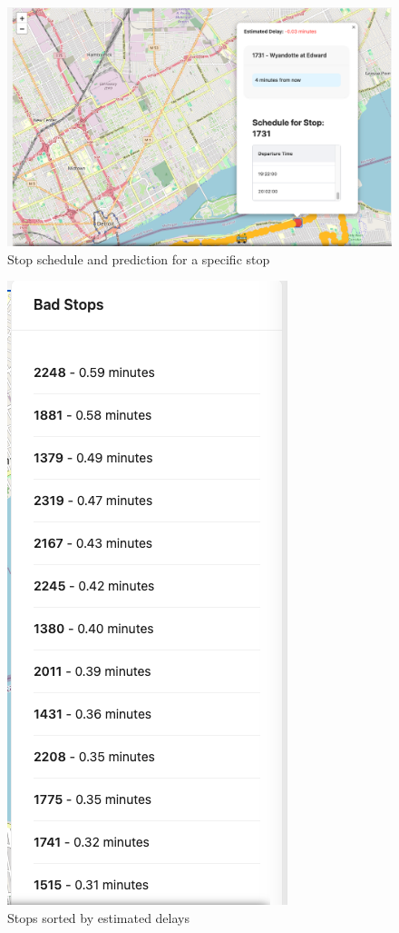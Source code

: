 \documentclass[conference]{IEEEtran}
\begin{document}
\begin{figure}
    \centering
    \includegraphics[width=1\linewidth]{stop_prediction.png}
    \caption{Stop schedule and prediction for a specific stop}
    \label{fig:enter-label}
\end{figure}

\begin{figure}
    \centering
    \includegraphics[width=0.5\linewidth]{bad_stops.png}
    \caption{Stops sorted by estimated delays}
    \label{fig:enter-label}
\end{figure}
\end{document}
